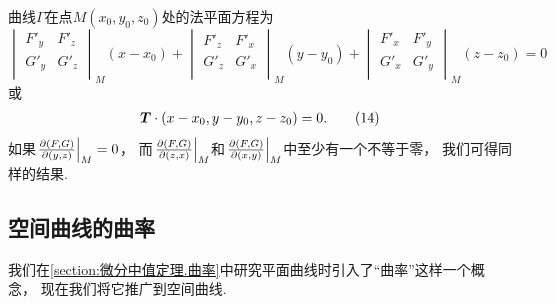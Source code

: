 曲线\(\Gamma\)在点\(M(x_0,y_0,z_0)\)处的法平面方程为\[
	\begin{vmatrix}
		F'_y & F'_z \\
		G'_y & G'_z \\
	\end{vmatrix}_M
	(x-x_0)
	+ \begin{vmatrix}
		F'_z & F'_x \\
		G'_z & G'_x \\
	\end{vmatrix}_M
	(y-y_0)
	+ \begin{vmatrix}
		F'_x & F'_y \\
		G'_x & G'_y \\
	\end{vmatrix}_M
	(z-z_0)
	= 0
\]或\begin{gather}
	\boldsymbol{T}\cdot(x-x_0,y-y_0,z-z_0)=0.
	\tag{14}
\end{gather}
如果\(\eval{\jacobi{F,G}{y,z}}_M = 0\)，
而\(\eval{\jacobi{F,G}{z,x}}_M\)和\(\eval{\jacobi{F,G}{x,y}}_M\)中至少有一个不等于零，
我们可得同样的结果.

\subsection{空间曲线的曲率}
我们在\cref{section:微分中值定理.曲率}中研究平面曲线时引入了“曲率”这样一个概念，
现在我们将它推广到空间曲线.

